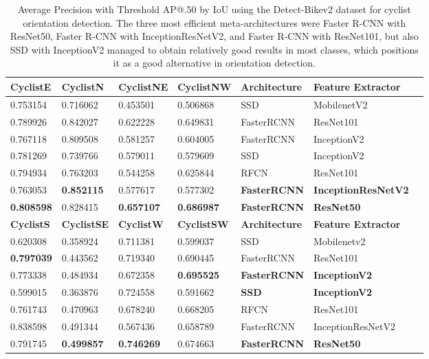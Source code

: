 \documentclass[journal]{IEEEtran}
\begin{document}
\begin{table*}[hb]
\begin{minipage}[c]{0.95\textwidth}
\caption{Average Precision with Threshold AP@.50 by IoU using the Detect-Bikev2 dataset for cyclist orientation detection. The three most efficient meta-architectures were Faster R-CNN with ResNet50, Faster R-CNN with InceptionResNetV2, and Faster R-CNN with ResNet101, but also SSD with InceptionV2 managed to obtain relatively good results in most classes, which positions it as a good alternative in orientation detection.
\label{table:Cyclist_Orientation_ByClass}}
\end{minipage}
\addtolength{\tabcolsep}{-1pt}
\begin{center}
\begin{tabular}{lllllll}
\toprule
\textbf{CyclistE} & \textbf{CyclistN}&\textbf{CyclistNE} & \textbf{CyclistNW} & \textbf{Architecture} &  \textbf{Feature Extractor}\\
\midrule
0.753154		 &  0.716062	 &  0.453501&  0.506868		 &          SSD &          MobilenetV2 \\
0.789926	 & 0.842027	 &  0.622228			&  0.649831	 &   FasterRCNN &          ResNet101 \\
0.767118 &  0.809508&  0.581257		 &  0.604005		 &   FasterRCNN &        InceptionV2 \\
0.781269 &  0.739766	 &  0.579011	 &  0.579609		 &          SSD &        InceptionV2 \\
0.794934 &  0.763203	 &  0.544258	 &  0.625844 &         RFCN & ResNet101\\
0.763053	 &  \textbf{0.852115} &  0.577617	 &  0.577302	 &  \textbf{FasterRCNN} &  \textbf{InceptionResNetV2} \\
\textbf{0.808598}	 &  0.828415	 & \textbf{0.657107}	& \textbf{0.686987}		 &  \textbf{FasterRCNN} &  \textbf{ResNet50} \\
\bottomrule
\toprule
\textbf{CyclistS }& \textbf{CyclistSE} & \textbf{CyclistW} & \textbf{CyclistSW} & \textbf{Architecture} &  \textbf{Feature Extractor} \\
\midrule
0.620308 &  0.358924	 & 0.711381 & 0.599037 &          SSD &          Mobilenetv2 \\
\textbf{0.797039}		 & 0.443562 &  0.719340	 &  0.690445	&   FasterRCNN &          ResNet101 \\
0.773338	 & 0.484934	 &  0.672358	& \textbf{0.695525} &   \textbf{FasterRCNN} &\textbf{InceptionV2} \\
0.599015		 & 0.363876	& 0.724558	 &  0.591662 &      \textbf{SSD} &\textbf{InceptionV2} \\
0.761743 &  0.470963 &  0.678240 &  0.668205	 &         RFCN &          ResNet101 \\
0.838598		 &0.491344	& 0.567436	&  0.658789	 &FasterRCNN&InceptionResNetV2 \\
0.791745	 & \textbf{0.499857}	& \textbf{0.746269}		 &  0.674663 &\textbf{FasterRCNN}&\textbf{ResNet50} \\
\bottomrule
\end{tabular}
\end{center}
\end{table*} 
\end{document}
